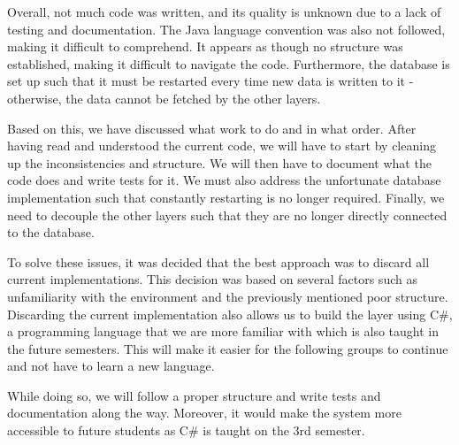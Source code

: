Overall, not much code was written, and its quality is unknown due to a lack of testing and documentation.
The Java language convention was also not followed\cite{java_convention}, making it difficult to comprehend.
It appears as though no structure was established, making it difficult to navigate the code. 
Furthermore, the database is set up such that it must be restarted every time new data is written to it - otherwise, the data cannot be fetched by the other layers\cite{knox2020}.

Based on this, we have discussed what work to do and in what order.
After having read and understood the current code, we will have to start by cleaning up the inconsistencies and structure.
We will then have to document what the code does and write tests for it.
We must also address the unfortunate database implementation such that constantly restarting is no longer required.
Finally, we need to decouple the other layers such that they are no longer directly connected to the database.

To solve these issues, it was decided that the best approach was to discard all current implementations. 
This decision was based on several factors such as unfamiliarity with the environment and the previously mentioned poor structure. 
Discarding the current implementation also allows us to build the layer using C\#, a programming language that we are more familiar with which is also taught in the future semesters. 
This will make it easier for the following groups to continue and not have to learn a new language.

While doing so, we will follow a proper structure and write tests and documentation along the way. 
Moreover, it would make the system more accessible to future students as C\# is taught on the 3rd semester.